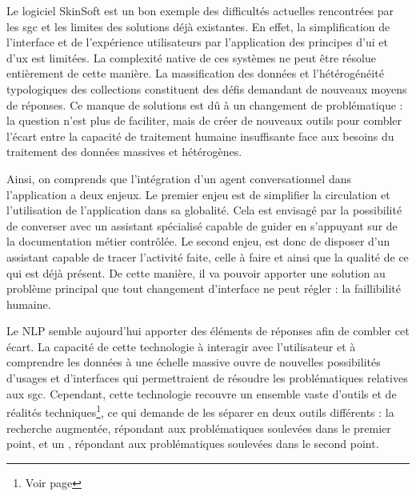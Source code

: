 Le logiciel SkinSoft est un bon exemple des difficultés actuelles rencontrées par les \gls{sgc} et les limites des solutions déjà existantes. En effet, la simplification de l'interface et de l'expérience utilisateurs par l'application des principes d'\gls{ui} et d'\gls{ux} est limitées. La complexité native de ces systèmes ne peut être résolue entièrement de cette manière. La massification des données et l'hétérogénéité typologiques des collections constituent des défis demandant de nouveaux moyens de réponses. Ce manque de solutions est dû à un changement de problématique : la question n'est plus de faciliter, mais de créer de nouveaux outils pour combler l'écart entre la capacité de traitement humaine insuffisante face aux besoins du traitement des données massives et hétérogènes.
		
Ainsi, on comprends que l'intégration d'un agent conversationnel dans l'application a deux enjeux. Le premier enjeu est de simplifier la circulation et l'utilisation de l'application dans sa globalité. Cela est envisagé par la possibilité de converser avec un assistant spécialisé capable de guider en s'appuyant sur de la documentation métier contrôlée. Le second enjeu, est donc de disposer d'un assistant capable de tracer l'activité faite, celle à faire et ainsi que la qualité de ce qui est déjà présent. De cette manière, il va pouvoir apporter une solution au problème principal que tout changement d'interface ne peut régler : la faillibilité humaine.
	
Le \gls{NLP} semble aujourd'hui apporter des éléments de réponses afin de combler cet écart. La capacité de cette technologie à interagir avec l'utilisateur et à comprendre les données à une échelle massive ouvre de nouvelles possibilités d'usages et d'interfaces qui permettraient de résoudre les problématiques relatives aux \gls{sgc}. Cependant, cette technologie recouvre un ensemble vaste d'outils et de réalités techniques\footnote{ Voir page \pageref{1.2.1}}, ce qui demande de les séparer en deux outils différents : la recherche augmentée, répondant aux problématiques soulevées dans le premier point, et un , répondant aux problématiques soulevées dans le second point.